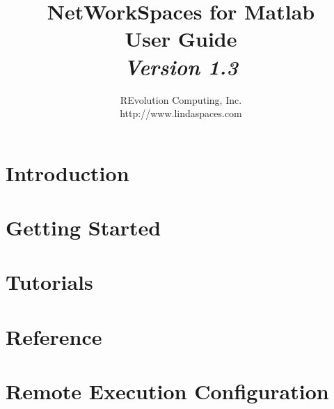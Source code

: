 \documentclass[12pt]{report}
\title{\bf NetWorkSpaces for Matlab \\ User Guide \\ \rm \it Version 1.3}
\author{REvolution Computing, Inc. \\ http://www.lindaspaces.com}
\begin{document}
\maketitle
\tableofcontents

\chapter{Introduction}


\chapter{Getting Started}


\chapter{Tutorials}



\appendix
\chapter{Reference}





\chapter{Remote Execution Configuration}

\end{document}
